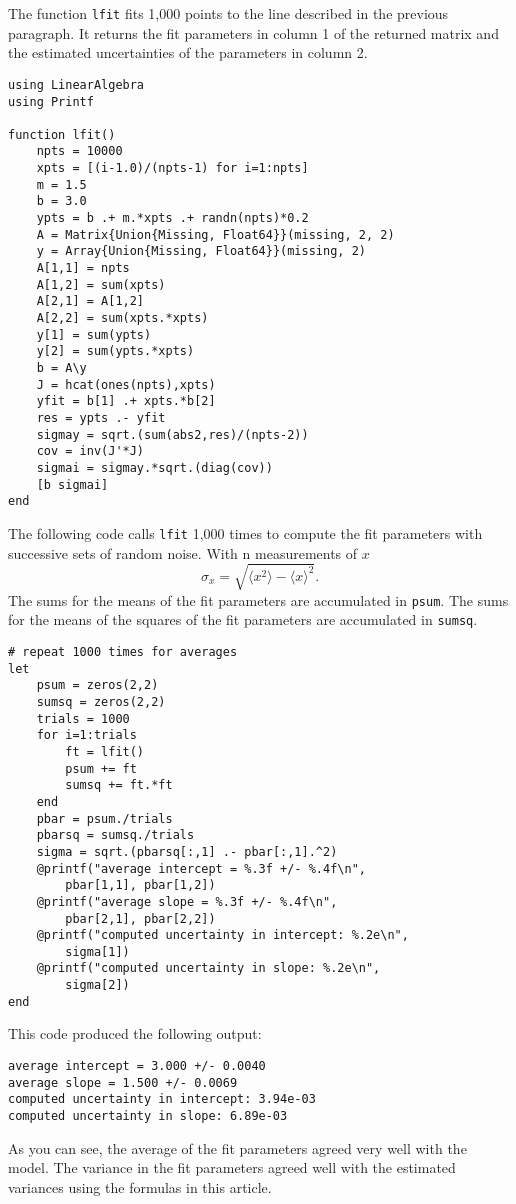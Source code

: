 \documentclass{scrartcl}
\begin{document}
The function \texttt{lfit} fits 1,000 points to the line
described in the previous paragraph. It returns the fit parameters
in column 1 of the returned matrix and the estimated uncertainties
of the parameters in column 2.
\begin{lstlisting}
using LinearAlgebra
using Printf

function lfit()
    npts = 10000
    xpts = [(i-1.0)/(npts-1) for i=1:npts]
    m = 1.5
    b = 3.0
    ypts = b .+ m.*xpts .+ randn(npts)*0.2
    A = Matrix{Union{Missing, Float64}}(missing, 2, 2)
    y = Array{Union{Missing, Float64}}(missing, 2)
    A[1,1] = npts
    A[1,2] = sum(xpts)
    A[2,1] = A[1,2]
    A[2,2] = sum(xpts.*xpts)
    y[1] = sum(ypts)
    y[2] = sum(ypts.*xpts)
    b = A\y
    J = hcat(ones(npts),xpts)
    yfit = b[1] .+ xpts.*b[2]
    res = ypts .- yfit
    sigmay = sqrt.(sum(abs2,res)/(npts-2))
    cov = inv(J'*J)
    sigmai = sigmay.*sqrt.(diag(cov))
    [b sigmai]
end
\end{lstlisting}
The following code calls \texttt{lfit} 1,000 times
to compute the fit parameters with successive sets
of random noise. With n measurements of $x$
\begin{equation}
\sigma_x = \sqrt{\langle x^2\rangle - \langle x\rangle^2}.
\end{equation}
The sums for the means of the fit parameters are accumulated
in \texttt{psum}. The sums for the means of the squares of
the fit parameters are accumulated in \texttt{sumsq}.
\begin{lstlisting}
# repeat 1000 times for averages
let
    psum = zeros(2,2)
    sumsq = zeros(2,2)
    trials = 1000
    for i=1:trials
        ft = lfit()
        psum += ft
        sumsq += ft.*ft
    end
    pbar = psum./trials
    pbarsq = sumsq./trials
    sigma = sqrt.(pbarsq[:,1] .- pbar[:,1].^2)
    @printf("average intercept = %.3f +/- %.4f\n",
        pbar[1,1], pbar[1,2])
    @printf("average slope = %.3f +/- %.4f\n",
        pbar[2,1], pbar[2,2])
    @printf("computed uncertainty in intercept: %.2e\n",
        sigma[1])
    @printf("computed uncertainty in slope: %.2e\n",
        sigma[2])
end
\end{lstlisting}
This code produced the following output:
\begin{lstlisting}
average intercept = 3.000 +/- 0.0040
average slope = 1.500 +/- 0.0069
computed uncertainty in intercept: 3.94e-03
computed uncertainty in slope: 6.89e-03
\end{lstlisting}
As you can see, the average of the fit parameters agreed
very well with the model. The variance in the fit
parameters agreed well with the estimated variances using
the formulas in this article.
\end{document}
